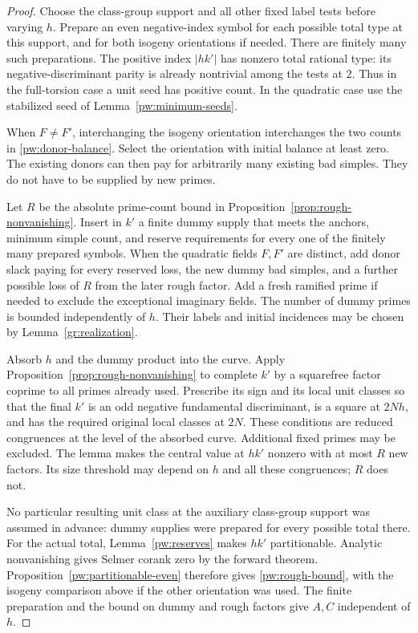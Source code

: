 \begin{proof}
Choose the class-group support and all other fixed label tests before
varying $h$.  Prepare an even negative-index symbol for each possible
total type at this support, and for both isogeny orientations if needed.
There are finitely many such preparations.  The positive index $|hk'|$
has nonzero total rational type: its negative-discriminant parity is
already nontrivial among the tests at $2$.  Thus in the full-torsion case
a unit seed has positive count.  In the quadratic case use the stabilized
seed of Lemma~\ref{pw:minimum-seeds}.

When $F\ne F'$, interchanging the isogeny orientation interchanges the two
counts in \eqref{pw:donor-balance}.  Select the orientation with initial
balance at least zero.  The existing donors can then pay for arbitrarily
many existing bad simples.  They do not have to be supplied by new primes.

Let $R$ be the absolute prime-count bound in Proposition~\ref{prop:rough-nonvanishing}.  Insert
in $k'$ a finite dummy supply that meets the anchors, minimum simple count,
and reserve requirements for every one of the finitely many prepared
symbols. When the quadratic fields $F,F'$ are distinct, add donor slack
paying for every reserved loss, the new dummy bad simples, and a further
possible loss of $R$ from the later rough factor. Add a fresh ramified
prime if needed to exclude the exceptional
imaginary fields.  The number of dummy primes is bounded independently
of $h$.  Their labels and initial incidences may be chosen by
Lemma~\ref{gr:realization}.

Absorb $h$ and the dummy product into the curve.  Apply
Proposition~\ref{prop:rough-nonvanishing} to complete $k'$ by a squarefree factor coprime to all
primes already used.  Prescribe its sign and its local unit classes so
that the final $k'$ is an odd negative fundamental discriminant, is a
square at $2Nh$, and has the required original local classes at $2N$.
These conditions are reduced congruences at the level of the absorbed
curve.  Additional fixed primes may be excluded.  The lemma makes the
central value at $hk'$ nonzero with at most $R$ new factors.  Its size
threshold may depend on $h$ and all these congruences; $R$ does not.

No particular resulting unit class at the auxiliary class-group support
was assumed in advance: dummy supplies were prepared for every possible
total there.  For the actual total, Lemma~\ref{pw:reserves} makes $hk'$
partitionable.  Analytic nonvanishing gives Selmer corank zero by the
forward theorem.  Proposition~\ref{pw:partitionable-even} therefore gives
\eqref{pw:rough-bound}, with the isogeny comparison above if the other
orientation was used.  The finite preparation and the bound on dummy and
rough factors give $A,C$ independent of $h$.
\end{proof}

